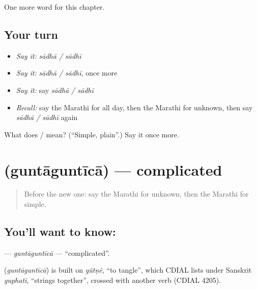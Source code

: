 \begin{grammarlens}[title={What you've built}]
One more word for this chapter.
\end{grammarlens}

\subsection*{Your turn}
\begin{itemize}
\raggedright
  \item \emph{Say it:} \emph{sādhā / sādhī}
  \item \emph{Say it:} \emph{sādhā / sādhī}, once more
  \item \emph{Say it:} say \emph{sādhā / sādhī}
  \item \emph{Recall:} say the Marathi for all day, then the Marathi for unknown, then say \emph{sādhā / sādhī} again
\end{itemize}

\begin{tcolorbox}[breakable,colback=teal!4,colframe=teal!35!black,title={Before you move on}]
What does  /  mean? (\textquotedblleft{}Simple, plain\textquotedblright{}.) Say it once more.
\end{tcolorbox}
\section[\texorpdfstring{\mr{गुंतागुंतीचा} (guntāguntīcā)}{गुंतागुंतीचा (guntāguntīcā)}]{ (guntāguntīcā) — complicated}

\label{lesson:MR-C259-guntaguntica}



\begin{quote}
Before the new one: say the Marathi for unknown, then the Marathi for simple.
\end{quote}

\subsection*{You'll want to know: }
\textbf{} — \emph{guntāguntīcā} — \textquotedblleft{}complicated\textquotedblright{}.

\begin{cousinweb}
\textbf{} (\emph{guntāguntīcā}) is built on \emph{gũtṇẽ}, \textquotedblleft{}to tangle\textquotedblright{}, which CDIAL lists under Sanskrit \emph{guphati}, \textquotedblleft{}strings together\textquotedblright{}, crossed with another verb (CDIAL 4205).
\end{cousinweb}

